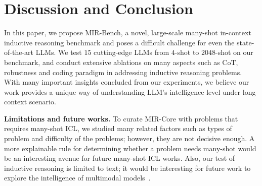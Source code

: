 \section{Discussion and Conclusion}

In this paper, we propose MIR-Bench, a novel, large-scale many-shot in-context inductive reasoning benchmark and poses a difficult challenge for even the state-of-the-art LLMs. We test $15$ cutting-edge LLMs from $4$-shot to $2048$-shot on our benchmark, and conduct extensive ablations on many aspects such as CoT, robustness and coding paradigm in addressing inductive reasoning problems. With many important insights concluded from our experiments, we believe our work provides a unique way of understanding LLM's intelligence level under long-context scenario.

\textbf{Limitations and future works.} To curate MIR-Core with problems that requires many-shot ICL, we studied many related factors such as types of problem and difficulty of the problems; however, they are not decisive enough. A more explainable rule for determining whether a problem needs many-shot would be an interesting avenue for future many-shot ICL works. Also, our test of inductive reasoning is limited to text; 
it would be interesting for future work to explore the intelligence of multimodal models~\citep{sun2023aligning, man2024situational, choudhuri2024ow}.
